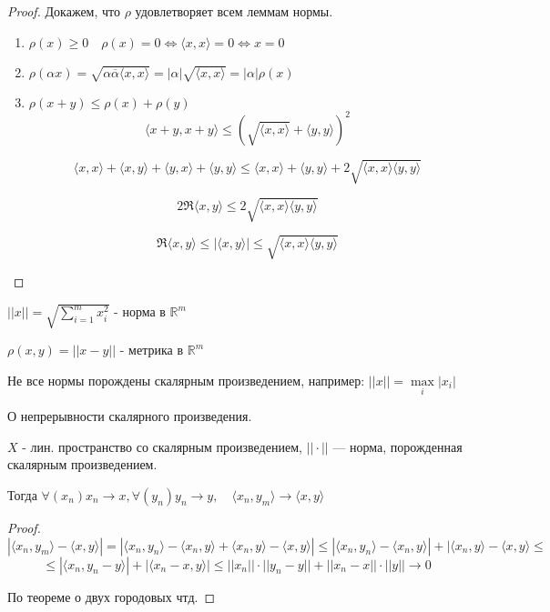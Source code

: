 \begin{proof}
    Докажем, что $\rho$ удовлетворяет всем леммам нормы.
    \begin{enumerate}
        \item $\rho(x)\geq 0\quad \rho(x)=0\Leftrightarrow \langle x,x\rangle=0\Leftrightarrow x=0$
        \item $\rho(\alpha x) = \sqrt{\alpha\overline\alpha\langle x,x\rangle}=|\alpha|\sqrt{\langle x,x\rangle}=|\alpha|\rho(x)$
        \item $\rho(x+y)\leq \rho(x)+\rho(y)$
        $$\langle x+y,x+y\rangle \leq (\sqrt{\langle x,x\rangle} + \langle y,y\rangle)^2$$

        $$\langle x,x\rangle+\langle x,y\rangle+\langle y,x\rangle+\langle y,y\rangle\leq \langle x,x\rangle + \langle y,y\rangle + 2\sqrt{\langle x,x\rangle\langle y,y\rangle}$$

        $$2\Re\langle x,y\rangle\leq 2\sqrt{\langle x,x\rangle\langle y,y\rangle}$$

        $$\Re\langle x,y\rangle \leq |\langle x,y\rangle|\leq\sqrt{\langle x,x\rangle\langle y,y\rangle}$$
    \end{enumerate}
\end{proof}

$||x|| = \sqrt{\sum\limits_{i=1}^m x_i^2}$ - норма в $\mathbb{R}^m$

$\rho(x,y)=||x-y||$ - метрика в $\mathbb{R}^m$

Не все нормы порождены скалярным произведением, например: $||x||=\max\limits_i |x_i|$

\begin{lemma}
    О непрерывности скалярного произведения.

    $X$ - лин. пространство со скалярным произведением, $||\cdot||$ --- норма, порожденная скалярным произведением.

    Тогда $\forall (x_n) x_n\to x, \forall (y_n) y_n\to y, \quad \langle x_n,y_m\rangle\to\langle x,y\rangle$
\end{lemma}

\begin{proof}
    $$|\langle x_n,y_m\rangle - \langle x,y\rangle|=|\langle x_n,y_n\rangle - \langle x_n,y\rangle + \langle x_n,y\rangle - \langle x,y\rangle|\leq|\langle x_n,y_n\rangle-\langle x_n,y\rangle| + |\langle x_n,y\rangle-\langle x,y\rangle\leq$$
    $$\leq |\langle x_n,y_n-y\rangle| + |\langle x_n-x,y\rangle|\leq ||x_n||\cdot||y_n-y||+||x_n-x||\cdot||y|| \to 0$$

    По теореме о двух городовых чтд.
\end{proof}

